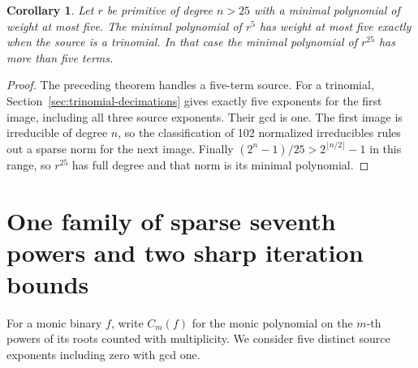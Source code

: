 \documentclass[11pt]{article}
\newtheorem{corollary}[theorem]{Corollary}
\begin{document}
\begin{corollary}
Let \(r\) be primitive of degree \(n>25\) with a minimal polynomial of
weight at most five. The minimal polynomial of \(r^5\) has weight
at most five exactly when the source is a trinomial. In that case
the minimal polynomial of \(r^{25}\) has more than five terms.
\end{corollary}
\begin{proof}
The preceding theorem handles a five-term source. For a trinomial,
Section~\ref{sec:trinomial-decimations} gives exactly five exponents
for the first image, including all three source exponents. Their gcd
is one. The first image is irreducible of degree \(n\), so the
classification of 102 normalized irreducibles rules out a sparse norm
for the next image. Finally \((2^n-1)/25>2^{\lfloor n/2\rfloor}-1\)
in this range, so \(r^{25}\) has full degree and that norm is its
minimal polynomial.
\end{proof}

\section{One family of sparse seventh powers and two sharp iteration bounds}
\label{sec:seventh-supports}
For a monic binary \(f\), write \(C_m(f)\) for the monic polynomial on
the \(m\)-th powers of its roots counted with multiplicity. We consider
five distinct source exponents including zero with gcd one.
\end{document}
